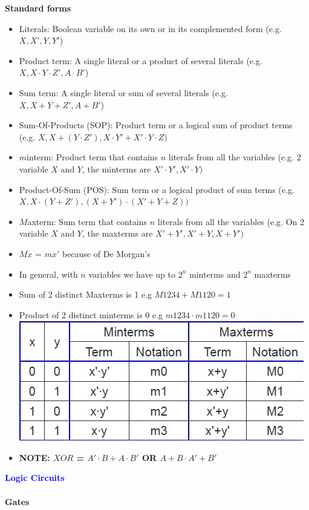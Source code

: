 \documentclass[a4paper]{article} \usepackage[backend=biber, style=numeric, sorting=none]{biblatex}
\begin{document}
\begin{multicols*}{4}
\textbf{Standard forms}
\begin{itemize}
\item Literals: Boolean variable on its own or in its complemented form (e.g. $X, X', Y, Y'$)
\item Product term: A single literal or a product of several literals (e.g. $X, X\cdot Y\cdot Z', A\cdot B'$)
\item Sum term: A single literal or sum of several literals (e.g. $X, X+Y+Z', A+B'$)
\item Sum-Of-Products (SOP): Product term or a logical sum of product terms (e.g. $X, X + (Y\cdot Z'), X \cdot Y' + X' \cdot Y \cdot Z)$
\item $m$interm: Product term that contains $n$ literals from all the variables (e.g. 2 variable $X$ and $Y$, the minterms are $X'\cdot Y', X'\cdot Y)$
\item Product-Of-Sum (POS): Sum term or a logical product of sum terms (e.g. $X, X \cdot (Y+Z'), (X+Y')\cdot(X'+Y+Z))$
\item $M$axterm: Sum term that contains $n$ literals from all the variables (e.g. On 2 variable $X$ and $Y$, the maxterms are $X'+Y', X'+Y, X+Y')$
\item $Mx$ = $mx'$ because of De Morgan's
\item In general, with $n$ variables we have up to $2^n$ minterms and $2^n$ maxterms
\item Sum of 2 distinct Maxterms is 1 e.g $M1234 + M1120 = 1$
\item Product of 2 distinct minterms is 0 e.g $m1234 \cdot m1120 = 0$\\

\includegraphics[scale=0.5]{min_max_terms.jpg}\\

\item \textbf{NOTE: $XOR$ = $A'\cdot B + A\cdot B'$ OR $A+B \cdot A'+B'$}
\end{itemize}

{\small\textbf{\textcolor{blue}{Logic Circuits}}}
\\\\\textbf{Gates}


\end{multicols*}
\end{document}
